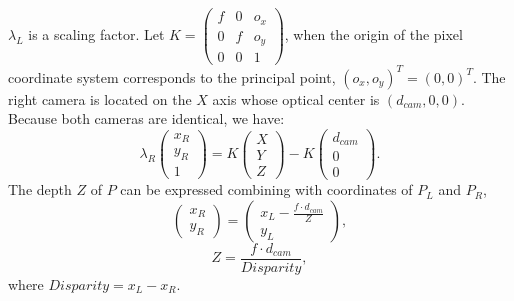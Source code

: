 \documentclass[10pt, conference, letterpaper]{IEEEtran}
\begin{document}
$\lambda_L$ is a scaling factor.
Let $K=\begin{pmatrix}f & 0 & o_x\\0 & f & o_y\\ 0 & 0 & 1\end{pmatrix}$,
when the origin of the pixel coordinate system corresponds to the principal point,
 $(o_x,o_y)^T=(0,0)^T$.
The right camera is located on the $X$ axis whose optical center is $(d_{cam},0,0)$.
Because both cameras are identical, we have:
\begin{equation}
\lambda_R \begin{pmatrix}x_R \\ y_R \\ 1 \end{pmatrix} = K \begin{pmatrix}X \\ Y \\ Z\end{pmatrix} - K  \begin{pmatrix}d_{cam} \\ 0 \\ 0\end{pmatrix}.
\end{equation}
The depth $Z$ of $P$ can be expressed combining with coordinates of $P_L$ and $P_R$,
\begin{equation}
\begin{pmatrix}x_R \\ y_R \end{pmatrix} = \begin{pmatrix} {x_L-\frac{f \cdot d_{cam}}{Z}} \\ y_L \end{pmatrix},
\end{equation}
\begin{equation}
  Z=\frac{f \cdot d_{cam}}{Disparity},
\end{equation}
where $Disparity=x_L-x_R$.
\end{document}
